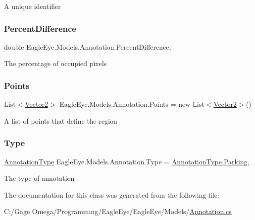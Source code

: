 A unique identifier 

\mbox{\label{class_eagle_eye_1_1_models_1_1_annotation_a47f59fa94ef8e7709e677aae1397ee00}} 
\subsubsection{\texorpdfstring{PercentDifference}{PercentDifference}}
{\footnotesize\ttfamily double Eagle\+Eye.\+Models.\+Annotation.\+Percent\+Difference\hspace{0.3cm}{\ttfamily [get]}, {\ttfamily [set]}}



The percentage of occupied pixels 

\mbox{\label{class_eagle_eye_1_1_models_1_1_annotation_a6a74da70cd09dda23b55cc889e5c84bb}} 
\subsubsection{\texorpdfstring{Points}{Points}}
{\footnotesize\ttfamily List$<$\mbox{\hyperlink{struct_eagle_eye_1_1_models_1_1_geometry_1_1_vector2}{Vector2}}$>$ Eagle\+Eye.\+Models.\+Annotation.\+Points = new List$<$\mbox{\hyperlink{struct_eagle_eye_1_1_models_1_1_geometry_1_1_vector2}{Vector2}}$>$()\hspace{0.3cm}{\ttfamily [get]}}



A list of points that define the region 

\mbox{\label{class_eagle_eye_1_1_models_1_1_annotation_a06bc959cdecde76cfbea151576ab8ef5}} 
\subsubsection{\texorpdfstring{Type}{Type}}
{\footnotesize\ttfamily \mbox{\hyperlink{class_eagle_eye_1_1_models_1_1_annotation_a38b72003ea887909fe12d6382092f7d9}{Annotation\+Type}} Eagle\+Eye.\+Models.\+Annotation.\+Type = \mbox{\hyperlink{class_eagle_eye_1_1_models_1_1_annotation_a38b72003ea887909fe12d6382092f7d9abaaacd7280e91aface947a1cc19d0f79}{Annotation\+Type.\+Parking}}\hspace{0.3cm}{\ttfamily [get]}, {\ttfamily [set]}}



The type of annotation 



The documentation for this class was generated from the following file\+:\begin{DoxyCompactItemize}
\item 
C\+:/\+Gage Omega/\+Programming/\+Eagle\+Eye/\+Eagle\+Eye/\+Models/\mbox{\hyperlink{_models_2_annotation_8cs}{Annotation.\+cs}}\end{DoxyCompactItemize}
